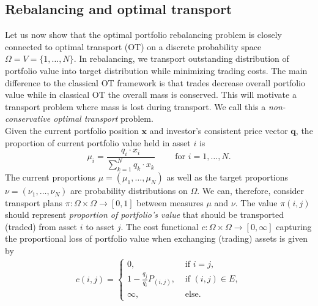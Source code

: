 \documentclass{article}
\theoremstyle{definition}
\def\bx{\mathbf{x}}
\def\bq{\mathbf{q}}
\begin{document}
\subsection{Rebalancing and optimal transport} \label{sec:rebalanceOT}

Let us now show that the optimal portfolio rebalancing problem is closely connected to optimal transport (OT) on a discrete probability space $\Omega = V = \{1, \dots, N\}$. In rebalancing, we transport outstanding distribution of portfolio value into target distribution while minimizing trading costs. The main difference to the classical OT framework is that trades decrease overall portfolio value while in classical OT the overall mass is conserved. This will motivate a transport problem where mass is lost during transport. We call this a \emph{non-conservative optimal transport} problem.\\

Given the current portfolio position $\bx$ and investor's consistent price vector $\bq$, the proportion of current portfolio value held in asset $i$ is
\[
\mu_i = \frac{q_i \cdot x_i}{\sum_{k=1}^N q_k \cdot x_k} \quad \quad \text{ for } i = 1, \dots, N.
\]
The current proportions $\mu = (\mu_1, \dots, \mu_N)$ as well as the target proportions $\nu = (\nu_1, \dots, \nu_N)$ are probability distributions on $\Omega$. We can, therefore, consider transport plans $\pi: \Omega \times \Omega \to [0,1]$ between measures $\mu$ and $\nu$. The value $\pi(i,j)$ should represent \emph{proportion of portfolio's value} that should be transported (traded) from asset $i$ to asset $j$. The cost functional $c: \Omega \times \Omega \to [0, \infty]$ capturing the proportional loss of portfolio value when exchanging (trading) assets is given by
\begin{align}
    c(i,j) = \begin{cases}
    0, & \text{ if } i = j, \\
    1 - \frac{q_j}{q_i} P_{(i,j)}, & \text{ if } (i, j) \in E, \\
    \infty, & \text{ else}.
    \end{cases}
\end{align}
\end{document}

